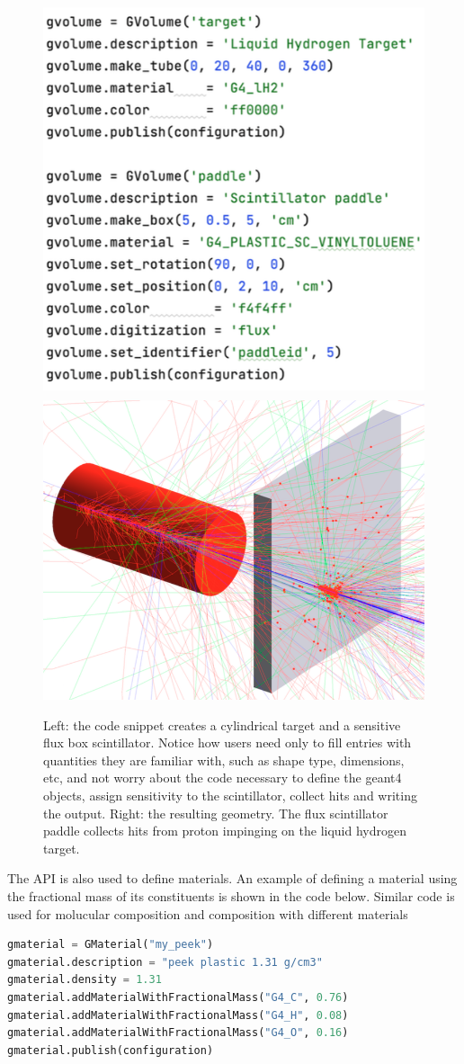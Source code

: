 \begin{figure}[h]
    \centering
    \includegraphics[width=.40\textwidth]{img/api_snippet}
    \includegraphics[width=.58\textwidth]{img/api}
    \caption{
    Left: the code snippet creates a cylindrical target and a sensitive flux box scintillator.
    Notice how users need only to fill entries with
    quantities they are familiar with, such as shape type, dimensions, etc, and not
    worry about the code necessary to define the geant4 objects, assign sensitivity to the
    scintillator, collect hits and writing the output.
    Right: the resulting geometry. The flux scintillator paddle collects hits from proton
    impinging on the liquid hydrogen target.}
    \label{fig:api}
\end{figure}

The API is also used to define materials. An example of defining a material using the fractional
mass of its constituents is shown in the code below. Similar code is used for molucular composition and
composition with different materials

\begin{lstlisting}[language=Python]
gmaterial = GMaterial("my_peek")
gmaterial.description = "peek plastic 1.31 g/cm3"
gmaterial.density = 1.31
gmaterial.addMaterialWithFractionalMass("G4_C", 0.76)
gmaterial.addMaterialWithFractionalMass("G4_H", 0.08)
gmaterial.addMaterialWithFractionalMass("G4_O", 0.16)
gmaterial.publish(configuration)
\end{lstlisting}

